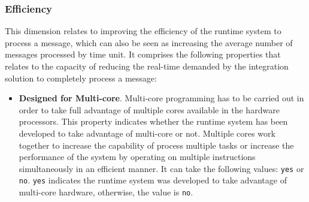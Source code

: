 \subsubsection{{Efficiency}}
\label{subsubsec:efficiency}
This dimension relates to improving the efficiency of the runtime system to process a message, which can also be seen as increasing the average number of messages processed by time unit. It comprises the following properties that relates to the capacity of reducing the real-time demanded by the integration solution to completely process a message:
\begin{itemize} 
\item \textbf{Designed for Multi-core}. Multi-core programming has to be carried out in order to take full advantage of multiple cores available in the hardware processors. This property indicates whether the runtime system has been developed to take advantage of multi-core or not. Multiple cores work together to increase the capability of process multiple tasks or increase the performance of the system by operating on multiple instructions simultaneously in an efficient manner. It can take the following values: \texttt{yes} or \texttt{no}. \texttt{yes} indicates the runtime system was developed to take advantage of multi-core hardware, otherwise, the value is \texttt{no}.


\end{itemize}
